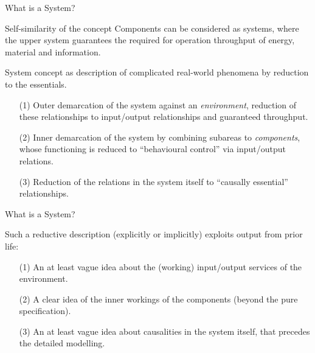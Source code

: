 \documentclass{beamer}
\begin{document}
\begin{frame}{What is a System?}

\begin{block}{Self-similarity of the concept}
  Components can be considered as systems, where the upper system guarantees
  the required for operation throughput of energy, material and information.
\end{block}

\begin{block}{
    System concept as description of complicated real-world phenomena by
    reduction to the essentials.}
  \begin{itemize}
  \item[(1)] Outer demarcation of the system against an \emph{environment},
    reduction of these relationships to input/output relationships and
    guaranteed throughput.
  \item[(2)] Inner demarcation of the system by combining subareas to
    \emph{components}, whose functioning is reduced to “behavioural control”
    via input/output relations.
  \item[(3)] Reduction of the relations in the system itself to “causally
    essential” relationships.
  \end{itemize}
\end{block}

\end{frame}

\begin{frame}{What is a System?}
\begin{block}{
    Such a reductive description (explicitly or implicitly) exploits output from
    prior life:}
  \begin{itemize}
  \item[(1)] An at least vague idea about the (working) input/output services
    of the environment.
  \item[(2)] A clear idea of the inner workings of the components (beyond the
    pure specification).
  \item[(3)] An at least vague idea about causalities in the system itself,
    that precedes the detailed modelling.
  \end{itemize}
\end{block}

\end{frame}
\end{document}
